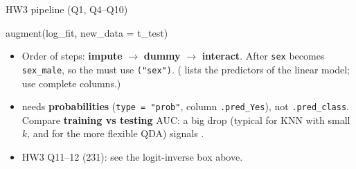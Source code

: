\begin{topic}{HW3 pipeline (Q1, Q4--Q10)}
\begin{rcode}
augment(log_fit, new_data = t_test) %
\end{rcode}
\begin{itemize}
\item Order of steps: \textbf{impute} $\to$ \textbf{dummy} $\to$ \textbf{interact}. After 
  \texttt{sex} becomes \texttt{sex\_male}, so the  must use \texttt{("sex")}.
  ( lists the predictors of the linear  model; use complete columns.)
\item {} needs \textbf{probabilities} (\texttt{type = "prob"}, column \texttt{.pred\_Yes}), not
  \texttt{.pred\_class}. Compare \textbf{training vs testing} AUC: a big drop (typical for KNN with small $k$,
  and for the more flexible QDA) signals .
\item HW3 Q11--12 (231): see the logit-inverse box above.
\end{itemize}
\end{topic}

